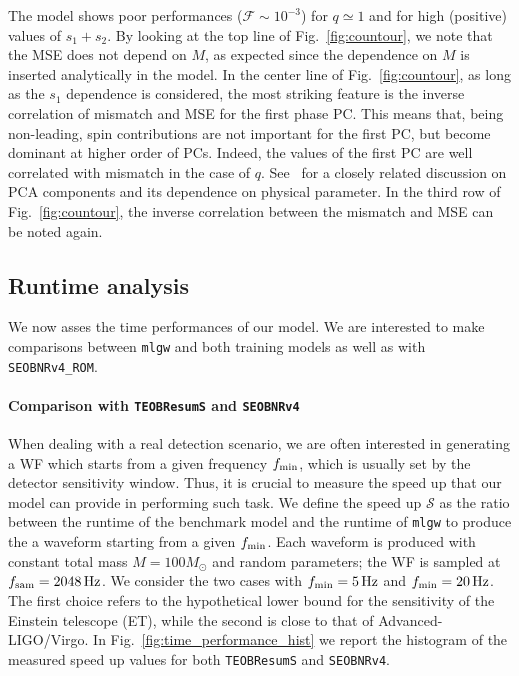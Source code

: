 The model shows poor performances ($\mathcal{F} \sim 10^{-3}$) for ${q\simeq 1}$ and for high (positive) values of $s_1+s_2$.
By looking at the top line of Fig.~\ref{fig:countour}, we note that the MSE does not depend on $M$,
as expected since the dependence on $M$ is inserted analytically in the model. In the center line of Fig.~\ref{fig:countour}, 
as long as the $s_1$ dependence is considered, the most striking feature is the inverse correlation of mismatch and MSE 
for the first phase PC. This means that, being non-leading, spin contributions are not important for the first PC, 
but become dominant at higher order of PCs. Indeed, the values of the first PC are well correlated with mismatch 
in the case of $q$. See~\cite{Ohme2013PCA_GW} for a closely related discussion on PCA components 
and its dependence on physical parameter.
In the third row of Fig.~\ref{fig:countour}, the inverse correlation between 
the mismatch and MSE can be noted again.
\subsection{Runtime analysis} 
\label{sec:runtime}
We now asses the time performances of our model.
We are interested to make comparisons between
{\tt mlgw} and both training models as well as 
with \texttt{SEOBNRv4\_ROM}.
%
\paragraph{Comparison with \texttt{TEOBResumS} and \texttt{SEOBNRv4}}
When dealing with a real detection scenario, we are often interested in generating a WF which starts from a given frequency 
$f_{\rm min}$, which is usually set by the detector sensitivity window. Thus, it is crucial to measure the speed up that 
our model can provide in performing such task. We define the speed up $\mathcal{S}$ as the ratio between the runtime 
of the benchmark model and the runtime of \texttt{mlgw} to produce the a waveform starting from a given $f_{\rm min}$. 
Each waveform is produced with constant total mass $M = 100 M_{\odot}$ and random parameters; the WF is sampled 
at $f_{\rm sam} = \SI{2048}{Hz}$. We consider the two cases with $f_{\rm min} = \SI{5}{Hz}$ and $f_{\rm min} = \SI{20}{Hz}$. 
The first choice refers to the hypothetical lower bound for the sensitivity of the Einstein telescope (ET), while the second 
is close to that of Advanced-LIGO/Virgo. In Fig.~\ref{fig:time_performance_hist} we report the histogram of the 
measured speed up values for both \texttt{TEOBResumS} and \texttt{SEOBNRv4}.
  
